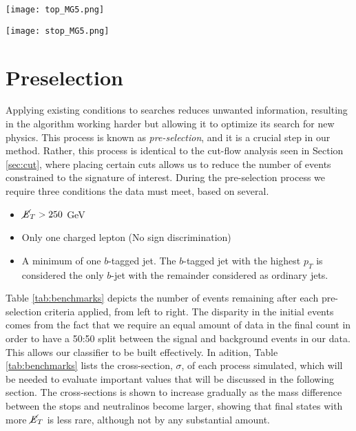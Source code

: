 \noindent\begin{minipage}{\textwidth}
\centering
  \begin{minipage}[htbp]{0.45\textwidth}
    \centering
    \texttt{[image: top\_MG5.png]}
    \label{fig:bkrdFeyn}
  \end{minipage}
  \hfill
  \begin{minipage}[htbp]{0.45\textwidth}
    \centering
    \texttt{[image: stop\_MG5.png]}
    \label{fig:sigFeyn}
  \end{minipage}
\end{minipage}
\section{Preselection}
Applying existing conditions to searches reduces unwanted information, resulting in the algorithm working harder but allowing it to optimize its search for new physics. This process is known as \textit{pre-selection}, and it is a crucial step in our method. Rather, this process is identical to the cut-flow analysis seen in Section \ref{sec:cut}, where placing certain cuts allows us to reduce the number of events constrained to the signature of interest. During the pre-selection process we require three conditions the data must meet, based on several. 
\begin{itemize}
    \item $\cancel{\it{E}}_{T}>250$ GeV
    \item Only one charged lepton (No sign discrimination)
    \item A minimum of one $b$-tagged jet. The $b$-tagged jet with the highest $p_T$ is considered the only $b$-jet with the remainder considered as ordinary jets.\\
\end{itemize}

Table \ref{tab:benchmarks} depicts the number of events remaining after each pre-selection criteria applied, from left to right. The disparity in the initial events comes from the fact that we require an equal amount of data in the final count in order to have a 50:50 split between the signal and background events in our data. This allows our classifier to be built effectively. In adition, Table \ref{tab:benchmarks} lists the cross-section, $\sigma$, of each process simulated, which will be needed to evaluate important values that will be discussed in the following section. The cross-sections is shown to increase gradually as the mass difference between the stops and neutralinos become larger, showing that final states with more $\cancel{\it{E}}_{T}$ is less rare, although not by any substantial amount. \\

